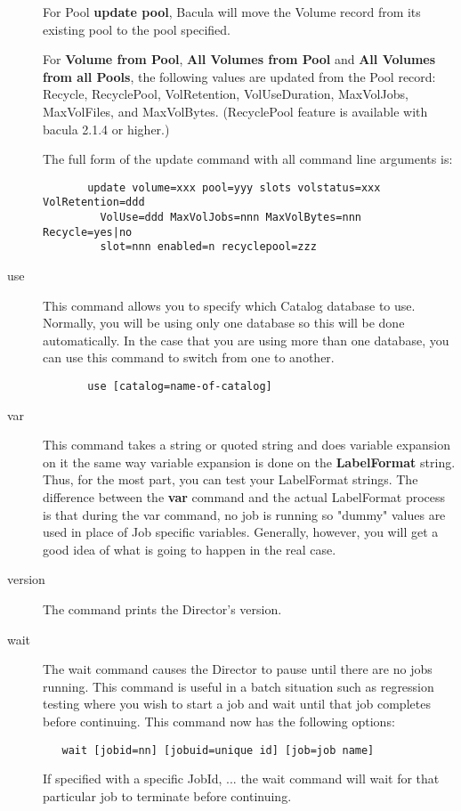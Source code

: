 \begin{description}
   For Pool {\bf update pool}, Bacula will move the Volume record from its
   existing pool to the pool specified.

   For {\bf Volume from Pool}, {\bf All Volumes from Pool} and {\bf All Volumes
     from all Pools}, the following values are updated from the Pool record:
   Recycle, RecyclePool, VolRetention, VolUseDuration, MaxVolJobs, MaxVolFiles,
   and MaxVolBytes.  (RecyclePool feature is available with bacula 2.1.4 or
   higher.)

   The full form of the update command with all command line arguments is:

\footnotesize
\begin{verbatim}
       update volume=xxx pool=yyy slots volstatus=xxx VolRetention=ddd
         VolUse=ddd MaxVolJobs=nnn MaxVolBytes=nnn Recycle=yes|no
         slot=nnn enabled=n recyclepool=zzz

\end{verbatim}
\normalsize

\item [use]
   This command allows you to specify which Catalog  database to use. Normally,
you will be using only one database so  this will be done automatically. In
the case that you are using  more than one database, you can use this command
to switch from  one to another.

\footnotesize
\begin{verbatim}
       use [catalog=name-of-catalog]
\end{verbatim}
\normalsize


\item [var]
   \label{var}
   This command takes a string or quoted string and  does variable expansion on
   it the same way variable expansion  is done on the {\bf LabelFormat} string.
   Thus, for the  most part, you can test your LabelFormat strings. The
   difference  between the {\bf var} command and the actual LabelFormat process
   is that during the var command, no job is running so "dummy"  values are
   used in place of Job specific variables. Generally,  however, you will get a
   good idea of what is going to happen  in the real case.

\item [version]
   The command prints the Director's version.

\item [wait]
   The wait command causes the Director to pause  until there are no jobs
   running. This command is useful in  a batch situation such as regression
   testing where you  wish to start a job and wait until that job completes
   before continuing. This command now has the following options:
\footnotesize
\begin{verbatim}
   wait [jobid=nn] [jobuid=unique id] [job=job name]
\end{verbatim}
\normalsize
   If specified with a specific JobId, ... the wait command will wait
   for that particular job to terminate before continuing.

\end{description}

